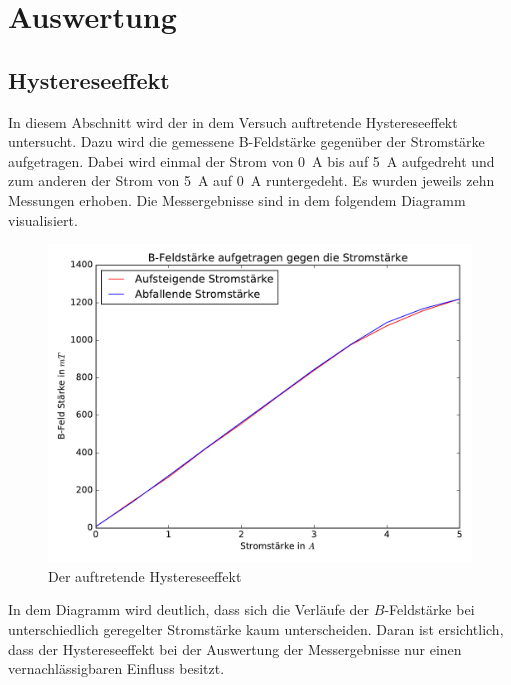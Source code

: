 





\newpage

\section{Auswertung}

\subsection{Hystereseeffekt}

In diesem Abschnitt wird der in dem Versuch auftretende Hystereseeffekt untersucht.
Dazu wird die gemessene B-Feldstärke gegenüber der Stromstärke aufgetragen. Dabei
wird einmal der Strom von \SI{0}{\ampere} bis auf \SI{5}{\ampere} aufgedreht und zum
anderen der Strom von \SI{5}{\ampere} auf \SI{0}{\ampere} runtergedeht.
Es wurden jeweils zehn Messungen erhoben. Die Messergebnisse sind in dem folgendem
Diagramm visualisiert.

\begin{figure}
  \includegraphics[width=\textwidth]{Hysterese.pdf}
  \caption{Der auftretende Hystereseeffekt}
  \label{fig:Hysterese}
\end{figure}

In dem Diagramm wird deutlich, dass sich die Verläufe der $B$-Feldstärke bei
unterschiedlich geregelter Stromstärke kaum unterscheiden. Daran ist ersichtlich,
dass der Hystereseeffekt bei der Auswertung der Messergebnisse nur einen vernachlässigbaren
Einfluss besitzt.

